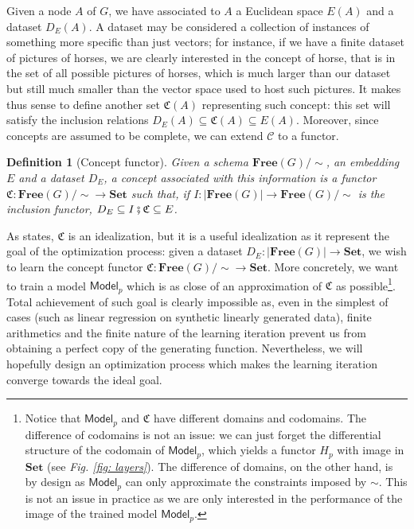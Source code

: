 \documentclass[11pt,a4paper,openright,twoside]{report}
\newcounter{mycounter}
\theoremstyle{plain}
\newtheorem{definition}[mycounter]{Definition}
\theoremstyle{definition}
\begin{document}
Given a node $A$ of $G$, we have associated to $A$ a Euclidean space $E(A)$ and a dataset $D_E(A)$. A dataset may be considered a collection of instances of something more specific than just vectors; for instance, if we have a finite dataset of pictures of horses, we are clearly interested in the concept of horse, that is in the set of all possible pictures of horses, which is much larger than our dataset but still much smaller than the vector space used to host such pictures. It makes thus sense to define another set $\mathfrak{C}(A)$ representing such concept: this set will satisfy the inclusion relations $D_E(A) \subseteq \mathfrak{C}(A) \subseteq E(A)$. Moreover, since concepts are assumed to be complete, we can extend $\mathcal{C}$ to a functor.

\begin{definition}[Concept functor]
  Given a schema $\mathbf{Free}(G)/{\sim}$, an embedding $E$ and a dataset $D_E$, a concept associated with this information is a functor $\mathfrak{C}: \mathbf{Free}(G)/{\sim} \to \mathbf{Set}$ such that, if $I: |\mathbf{Free}(G)| \to \mathbf{Free}(G)/{\sim}$ is the inclusion functor, $D_E \subseteq I \fatsemi \mathfrak{C} \subseteq E$.
\end{definition}

As \cite{gavranovic2019compositional} states, $\mathfrak{C}$ is an idealization, but it is a useful idealization as it represent the goal of the optimization process: given a dataset $D_E: |\mathbf{Free}(G)| \to \mathbf{Set}$, we wish to learn the concept functor $\mathfrak{C}: \mathbf{Free}(G)/{\sim} \to \mathbf{Set}$. More concretely, we want to train a model $\mathsf{Model}_p$ which is as close of an approximation of $\mathfrak{C}$ as possible\footnote{Notice that $\mathsf{Model}_p$ and $\mathfrak{C}$ have different domains and codomains. The difference of codomains is not an issue: we can just forget the differential structure of the codomain of $\mathsf{Model}_p$, which yields a functor $H_p$ with image in $\mathbf{Set}$ (see \textit{Fig. \ref{fig: layers}}). The difference of domains, on the other hand, is by design as $\mathsf{Model}_p$ can only approximate the constraints imposed by $\sim$. This is not an issue in practice as we are only interested in the performance of the image of the trained model $\mathsf{Model}_p$.}. Total achievement of such goal is clearly impossible as, even in the simplest of cases (such as linear regression on synthetic linearly generated data), finite arithmetics and the finite nature of the learning iteration prevent us from obtaining a perfect copy of the generating function.
Nevertheless, we will hopefully design an optimization process which makes the learning iteration converge towards the ideal goal.
\end{document}
